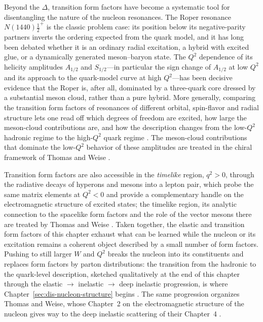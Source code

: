 Beyond the $\Delta$, transition form factors have become a systematic tool for
disentangling the nature of the nucleon resonances. The Roper resonance
$N(1440)\tfrac{1}{2}^{+}$ is the classic problem case: its position below its
negative-parity partners inverts the ordering expected from the quark model, and it has
long been debated whether it is an ordinary radial excitation, a hybrid with excited
glue, or a dynamically generated meson--baryon state. The $Q^{2}$ dependence of its
helicity amplitudes $A_{1/2}$ and $S_{1/2}$---in particular the sign change of $A_{1/2}$
at low $Q^{2}$ and its approach to the quark-model curve at high $Q^{2}$---has been
decisive evidence that the Roper is, after all, dominated by a three-quark core dressed
by a substantial meson cloud, rather than a pure hybrid. More generally, comparing the
transition form factors of resonances of different orbital, spin-flavor and radial
structure lets one read off which degrees of freedom are excited, how large the
meson-cloud contributions are, and how the description changes from the low-$Q^{2}$
hadronic regime to the high-$Q^{2}$
quark regime \cite[Ch.~14]{Amsler2018}. The meson-cloud contributions that dominate the
low-$Q^{2}$ behavior of these amplitudes are treated in the chiral framework of Thomas
and Weise \cite[Ch.~7.4]{ThomasWeise2001}.

Transition form factors are also accessible in the \emph{timelike} region, $q^{2}>0$,
through the radiative decays of hyperons and mesons into a lepton pair, which probe the
same matrix elements at $Q^{2}<0$ and provide a complementary handle on the electromagnetic
structure of excited states; the timelike region, its analytic connection to the spacelike
form factors and the role of the vector mesons there are treated by Thomas and Weise
\cite[Ch.~2.2.7]{ThomasWeise2001}. Taken together, the elastic and transition form
factors of
this chapter exhaust what can be learned while the nucleon or its excitation remains a
coherent object described by a small number of form factors. Pushing to still larger $W$
and $Q^{2}$ breaks the nucleon into its constituents and replaces form factors by parton
distributions: the transition from the hadronic to the quark-level description, sketched
qualitatively at the end of this chapter through the elastic $\to$ inelastic $\to$ deep
inelastic progression, is where Chapter~\ref{sec:dis-nucleon-structure} begins
\cite[Ch.~14]{Amsler2018}. The same progression organizes Thomas and Weise, whose
Chapter~2 on the electromagnetic structure of the nucleon gives way to the deep
inelastic scattering of their Chapter~4 \cite[Ch.~2, Ch.~4]{ThomasWeise2001}.

